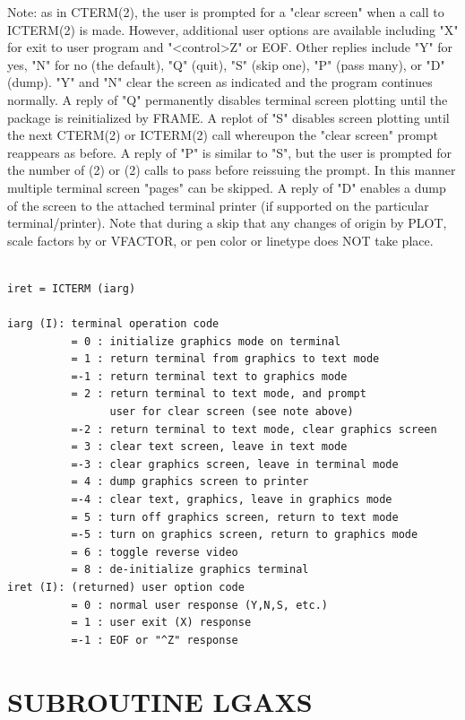 \documentclass[11pt]{report}
\begin{document}
Note:  as in CTERM(2), the user is prompted for a "clear screen"
when a call to ICTERM(2) is made.  However, additional user options
are available including "X" for exit to user program and "<control>Z" or EOF.
Other replies include "Y" for yes, "N" for no (the default), "Q" (quit), 
"S" (skip one), "P" (pass many), or "D" (dump).  "Y" and "N" clear
the screen as indicated and the program continues normally.
A reply of "Q" permanently disables terminal screen plotting until
the package is reinitialized by FRAME.  A replot of "S" disables
screen plotting until the next CTERM(2) or ICTERM(2) call whereupon the 
"clear screen" prompt reappears as before.  A reply of "P" is similar
to "S", but the user is prompted for the number of (2) or
(2) calls to pass before reissuing the prompt.  In this manner multiple terminal
screen "pages" can be skipped.  A reply of "D" enables a dump
of the screen to the attached terminal printer (if supported on the
particular terminal/printer).  Note that during a skip that any changes
of origin by PLOT, scale factors by  or VFACTOR, or pen color
or linetype does NOT take place.
\begin{verbatim}

iret = ICTERM (iarg)

iarg (I): terminal operation code
          = 0 : initialize graphics mode on terminal
          = 1 : return terminal from graphics to text mode
          =-1 : return terminal text to graphics mode
          = 2 : return terminal to text mode, and prompt
                user for clear screen (see note above)
          =-2 : return terminal to text mode, clear graphics screen
          = 3 : clear text screen, leave in text mode
          =-3 : clear graphics screen, leave in terminal mode
          = 4 : dump graphics screen to printer
          =-4 : clear text, graphics, leave in graphics mode
          = 5 : turn off graphics screen, return to text mode
          =-5 : turn on graphics screen, return to graphics mode
          = 6 : toggle reverse video
          = 8 : de-initialize graphics terminal
iret (I): (returned) user option code
          = 0 : normal user response (Y,N,S, etc.)
          = 1 : user exit (X) response
          =-1 : EOF or "^Z" response
\end{verbatim}

\section{SUBROUTINE  LGAXS}
\end{document}
